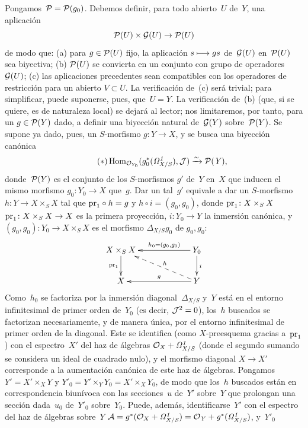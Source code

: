 Pongamos~$\cal{P}=\cal{P}(g_0)$. Debemos definir, para todo abierto~$U$ de~$Y$, una aplicación
$$
\cal{P}(U)\times\cal{G}(U)\to\cal{P}(U)
$$
de modo que: (a) para $g\in\cal{P}(U)$ fijo, la aplicación $s\mto gs$ de~$\cal{G}(U)$ en~$\cal{P}(U)$ sea biyectiva; (b) $\cal{P}(U)$ se convierta en un conjunto con grupo de operadores~$\cal{G}(U)$; (c) las aplicaciones precedentes sean compatibles con los operadores de restricción para un abierto $V\subset U$. La verificación de~(c) será trivial; para simplificar, puede suponerse, pues, que~$U=Y$. La verificación de~(b) (que, si se quiere, es de naturaleza local) se dejará al lector; nos limitaremos, por tanto, para un $g\in\cal{P}(Y)$ dado, a definir una biyección natural de~$\cal{G}(Y)$ sobre~$\cal{P}(Y)$. Se supone ya dado, pues, un $S$-morfismo $g\colon Y\to X$, y se busca una biyección canónica
\begin{equation*}
\label{eq:III.5.1.*}
\tag{$*$}
\Hom_{\cal{O}_{Y_0}}(g_0^*(\it{\Omega}^1_{X/S}),\cal{J})\isomto
\cal{P}(Y),
\end{equation*}
donde~$\cal{P}(Y)$ es el conjunto de los $S$-morfismos $g'$ de~$Y$ en~$X$ que inducen el mismo morfismo $g_0\colon Y_0\to X$ que~$g$. Dar un tal~$g'$ equivale a dar un $S$-morfismo $h\colon Y\to X\times_S X$ tal que ${\pr}_1\circ h=g$ y $h\circ i=(g_0,g_0)$, donde
{${\pr}_1\colon X\times_S X$}
{${\pr}_1\colon X\times_S X\to X$}
es la primera proyección, $i\colon Y_0\to Y$ la inmersión canónica, y $(g_0,g_0)\colon Y_0\to X\times_S X$ es el morfismo $\Delta_{X/S}g_0$ de
$g_0,g_0$:
\begingroup
\shorthandoff{>}%
$$
\xymatrix@C=2.2cm{ X\times_S X \ar[d]_{{\pr}_1} & Y_0
\ar[l]_-{h_0=(g_0,g_0)} \ar[d]^i \\ X & Y \ar[l]_-g
\ar@{-->}[lu]_-h }
$$
\endgroup
Como~$h_0$ se factoriza por la inmersión diagonal~$\Delta_{X/S}$ y~$Y$ está en el entorno infinitesimal de primer orden de~$Y_0$ (es decir, $\cal{J}^2=0$), los~$h$ buscados se factorizan necesariamente, y de manera única, por el entorno infinitesimal de primer orden de la diagonal. Este se identifica (como $X$-preesquema gracias a~${\pr}_1$) con el espectro~$X'$ del haz de álgebras $\cal{O}_X+\it{\Omega}^1_{X/S}$ (donde el segundo sumando se considera un ideal de cuadrado nulo), y el morfismo diagonal $X\to X'$ corresponde a la aumentación canónica de este haz de álgebras. Pongamos $Y'=X'\times_XY$ y $Y'_0=Y'\times_YY_0=X'\times_XY_0$, de modo que los~$h$ buscados están en correspondencia biunívoca con las secciones~$u$ de~$Y'$ sobre~$Y$ que prolongan una sección dada~$u_0$ de~$Y'_0$ sobre~$Y_0$. Puede, además, identificarse~$Y'$ con el espectro del haz de álgebras sobre~$Y$ $\cal{A}=g^*(\cal{O}_X+\it{\Omega}^1_{X/S})=\cal{O}_Y+g^*(\it{\Omega}^1_{X/S})$, y~$Y'_0$
